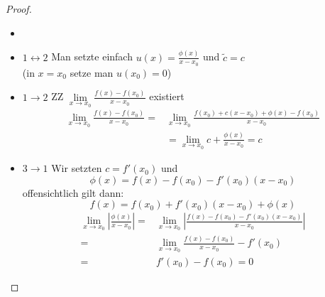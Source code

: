 \begin{proof}{
	\begin{itemize}
		\item[ ]
		\item[]$1 \leftrightarrow 2$ Man setzte einfach $u\left(x\right) = \frac{\phi\left(x\right)}{x-x_0}$ und $\tilde{c} = c$ \\
		(in $x = x_0$ setze man $u\left(x_0\right) = 0$)
		\item[]$1 \rightarrow 2$ ZZ $\lim\limits_{x \rightarrow x_0}{\frac{f\left(x\right)-f\left(x_0\right)}{x-x_0}}$ existiert
		\begin{align*}
			\lim\limits_{x\rightarrow x_0}
			{\frac{f\left(x\right) - f\left(x_0\right)}{x-x_0}} 
			= & \lim\limits_{x \rightarrow x_0}
			{\frac{f\left(x_0\right) + c\left(x-x_0\right)+\phi
			\left(x\right)-f\left(x_0\right)}{x-x_0}} \\
			& = \lim\limits_{x\rightarrow x_0}
			{c + \frac{\phi \left(x\right)}{x-x_0}} = c
		\end{align*}
		\item[]$3\rightarrow 1$ Wir setzten $ c = f'\left(x_0\right)$ und 
		\begin{equation*}
			\phi\left(x\right) = f\left(x\right) - f\left(x_0\right) - f'\left(x_0\right)\left(x-x_0\right)
		\end{equation*}
		offensichtlich gilt dann:
		\begin{equation*}
			f\left(x\right) = f\left(x_0\right) 
			+ f'\left(x_0\right)\left(x-x_0\right) + \phi\left(x\right)
		\end{equation*}
		\begin{align*}
			\lim\limits_{x\rightarrow x_0}
			{\left\vert \frac{\phi\left(x\right)}{x-x_0}\right\vert} 
			= & \lim\limits_{x \rightarrow x_0}
			{\left\vert \frac{f\left(x\right)-f\left(x_0\right)-
			f'\left(x_0\right)\left(x-x_0\right)}{x-x_0}\right\vert} \\
			= & \lim\limits_{x\rightarrow x_0}{\frac{f\left(x\right)-
			f\left(x_0\right)}{x-x_0} - f'\left(x_0\right)} \\
			= & f'\left(x_0\right) - f\left(x_0\right) 
			=0
		\end{align*}
	\end{itemize}
	\qedhere
}\end{proof}
